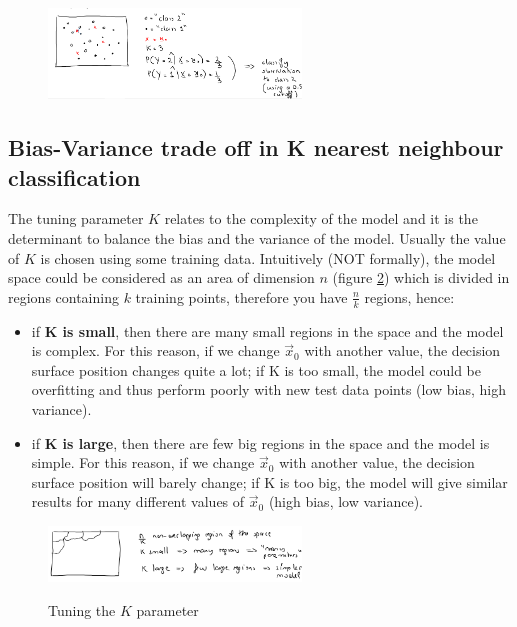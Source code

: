 \begin{figure}[h]
\caption{}
\centering
\includegraphics[width=0.6\textwidth]{Kneighbour}
\label{Kneigb}
\end{figure}

    \subsection{Bias-Variance trade off in K nearest neighbour classification}
      The tuning parameter $K$ relates to the complexity of the model and it is the determinant to balance the bias and the variance of the model. Usually the value of $K$ is chosen using some training data. 
      Intuitively (NOT formally), the model space could be considered as an area of dimension $n$ (figure \ref{KneigCompLog}) which is divided in regions containing $k$ training points, therefore you have $\frac{n}{k}$ regions, hence:
      \begin{itemize}
        \item if \textbf{K is small}, then there are many small regions in the space and the model is complex. For this reason, if we change $\vec{x}_0$ with another value, the decision surface position changes quite a lot; if K is too small, the model could be overfitting and thus perform poorly with new test data points (low bias, high variance).
        \item if \textbf{K is large}, then there are few big regions in the space and the model is simple. For this reason, if we change $\vec{x}_0$ with another value, the decision surface position will barely change; if K is too big, the model will give similar results for many different values of $\vec{x}_0$ (high bias, low variance).
      \end{itemize}

\begin{figure}[h]
\caption{Tuning the $ K $ parameter}
\centering
\includegraphics[width=0.6\textwidth]{KneigComplexityLogic}
\label{KneigCompLog}
\end{figure}

